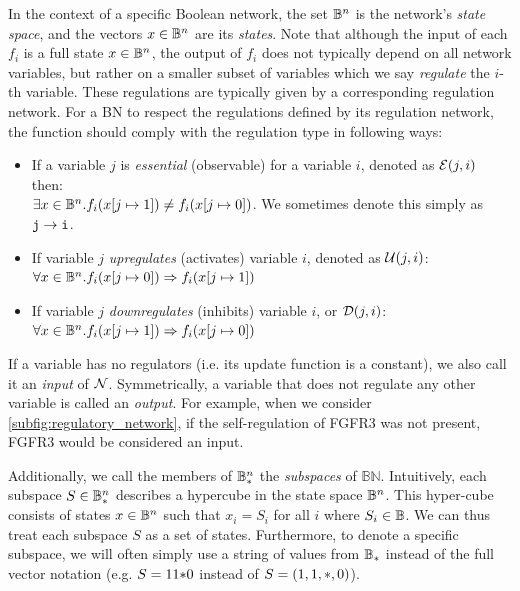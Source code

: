 In the context of a specific Boolean network, the set $\mathbb{B}^n$ is the network's \emph{state space}, and the vectors $x \in \mathbb{B}^n$ are its \emph{states}. Note that although the input of each $f_i$ is a full state $x \in \mathbb{B}^n$, the output of $f_i$ does not typically depend on all network variables, but rather on a smaller subset of variables which we say \emph{regulate} the $i$-th variable. These regulations are typically given by a corresponding regulation network. For a BN to respect the regulations defined by its regulation network, the function should comply with the regulation type in following ways:

\begin{itemize}
    \item If a variable $j$ is \emph{essential} (observable) for a variable $i$, denoted as $\mathcal{E}(j,i)$ then: \\ $\exists x \in \mathbb{B}^n . f_i(x[j \mapsto 1]) \neq f_i(x[j \mapsto 0])$. We sometimes denote this simply as $\texttt{j} \to \texttt{i}$.
    \item If variable $j$ \emph{upregulates} (activates) variable $i$, denoted as $\mathcal{U}(j,i)$: \\
    $ \forall x \in \mathbb{B}^n . f_i(x[j \mapsto 0]) \Rightarrow f_i(x[j \mapsto 1])$
    \item If variable $j$ \emph{downregulates} (inhibits) variable $i$, or $\mathcal{D}(j,i)$: \\ $\forall x \in \mathbb{B}^n . f_i(x[j \mapsto 1]) \Rightarrow f_i(x[j \mapsto 0])$
\end{itemize}


If a variable has no regulators (i.e. its update function is a constant), we also call it an \emph{input} of $\mathcal{N}$. Symmetrically, a variable that does not regulate any other variable is called an \emph{output}. For example, when we consider \autoref{subfig:regulatory_network}, if the self-regulation of FGFR3 was not present, FGFR3 would be considered an input.

Additionally, we call the members of $\mathbb{B}_{{*}}^n$ the \emph{subspaces} of $\mathbb{BN}$. Intuitively, each subspace $S \in \mathbb{B}_{{*}}^n$ describes a hypercube in the state space $\mathbb{B}^n$. This hyper-cube consists of states $x \in \mathbb{B}^n$ such that $x_i = S_i$ for all $i$ where $S_i \in \mathbb{B}$. We can thus treat each subspace $S$ as a set of states. Furthermore, to denote a specific subspace, we will often simply use a string of values from $\mathbb{B}_{{*}}$ instead of the full vector notation (e.g. $S = 11{*}0$ instead of $S = (1,1,{*},0)$).	

